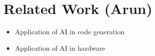 \section{Related Work (Arun)}
\label{sec:related_work}
\begin{itemize}
    \item Application of AI in code generation
    \item Application of AI in hardware 
\end{itemize}
\cite{thakur2024verigen}
 
